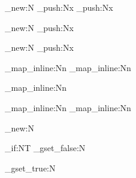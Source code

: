 
\seq_new:N   \sections@clb@entryFiles 
\seq_push:Nx 
\seq_push:Nx 

\seq_new:N   \sections@clb@entryRoots
\seq_push:Nx 

\seq_new:N   \sections@clb@entryParts
\seq_push:Nx 

\seq_map_inline:Nn \sections@clb@entryRoots
{
    \seq_map_inline:Nn \sections@clb@entryFiles
    {
    }
}

\seq_map_inline:Nn \sections@clb@entryRoots
{
}

\seq_map_inline:Nn \sections@clb@entryRoots
{
    \seq_map_inline:Nn \sections@clb@entryParts
    {
    }
}


\bool_new:N \sections@bMain

\NewDocumentCommand{\sections@onLoad}{}
{
    \sections@frame@bgn

    \bool_if:NT \sections@bMain
    {   
        \bool_gset_false:N \sections@bMain
    }
}

\NewDocumentCommand{\sections@onDrop}{}
{
    \sections@frame@end
}

\NewDocumentCommand{\sections@onSection}{}
{
    \bool_gset_true:N \sections@bMain
    
    \dontIncludeSelf
}

\NewDocumentCommand{\sections@part@onLoad}{}
{
    \sections@part@bgn
}

\NewDocumentCommand{\sections@part@onDrop}{}
{
    \sections@part@end
}

